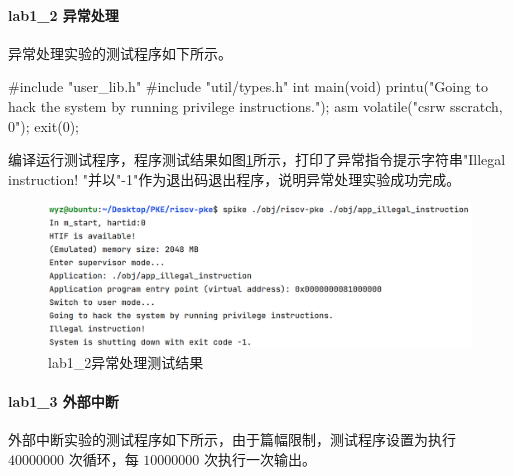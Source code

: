 \paragraph{lab1_2 异常处理}
异常处理实验的测试程序如下所示。
\begin{cppcode}
#include "user_lib.h"
#include "util/types.h"
int main(void) {
  printu("Going to hack the system by running privilege instructions.\n");
  asm volatile("csrw sscratch, 0");
  exit(0);
}
\end{cppcode}
编译运行测试程序，程序测试结果如图\ref{fig:lab1-2-testres}所示，打印了异常指令提示字符串"Illegal instruction!
"并以"-1"作为退出码退出程序，说明异常处理实验成功完成。
\begin{figure}[!htbp]
    \centering
    \includegraphics[width = 12cm]{figure/lab1_2_testresult.png}
    \caption{lab1_2异常处理测试结果}
    \label{fig:lab1-2-testres}
\end{figure}
\paragraph{lab1_3 外部中断} 
外部中断实验的测试程序如下所示，由于篇幅限制，测试程序设置为执行 $40000000$ 次循环，每 $10000000$ 次执行一次输出。

